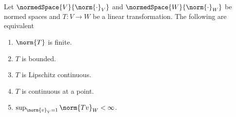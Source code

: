 \begin{theorem} \label{th:linearTransformation}
    Let \(\normedSpace{V}{\norm{\cdot}_V}\) and \(\normedSpace{W}{\norm{\cdot}_W}\) be normed spaces and \(T: V \to W\) be a linear transformation. The following are equivalent
    \begin{enumerate}
        \item \(\norm{T}\) is finite. \label{it:LT_1}
        \item \(T\) is bounded. \label{it:LT_2}
        \item \(T\) is Lipschitz continuous. \label{it:LT_3}
        \item \(T\) is continuous at a point. \label{it:LT_4}
        \item \(\sup_{\norm{v}_V = 1} \norm{Tv}_W < \infty\). \label{it:LT_5}
    \end{enumerate}
\end{theorem}

